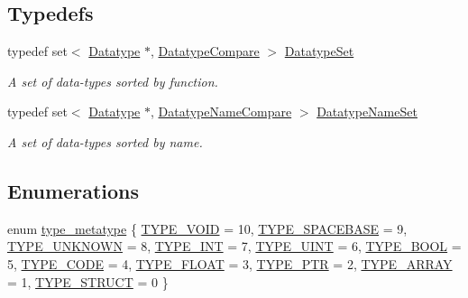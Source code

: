 \subsection*{Typedefs}
\begin{DoxyCompactItemize}
\item 
typedef set$<$ \mbox{\hyperlink{class_datatype}{Datatype}} $\ast$, \mbox{\hyperlink{struct_datatype_compare}{Datatype\+Compare}} $>$ \mbox{\hyperlink{type_8hh_a718b9f8902a3f2dcc61b4eb84c58adf2}{Datatype\+Set}}
\begin{DoxyCompactList}\small\item\em A set of data-\/types sorted by function. \end{DoxyCompactList}\item 
typedef set$<$ \mbox{\hyperlink{class_datatype}{Datatype}} $\ast$, \mbox{\hyperlink{struct_datatype_name_compare}{Datatype\+Name\+Compare}} $>$ \mbox{\hyperlink{type_8hh_aa1db0a143363e2b1d1150e3f2168c3ea}{Datatype\+Name\+Set}}
\begin{DoxyCompactList}\small\item\em A set of data-\/types sorted by name. \end{DoxyCompactList}\end{DoxyCompactItemize}
\subsection*{Enumerations}
\begin{DoxyCompactItemize}
\item 
enum \mbox{\hyperlink{type_8hh_aef6429f2523cdf4d415ba04a0209e61f}{type\+\_\+metatype}} \{ \newline
\mbox{\hyperlink{type_8hh_aef6429f2523cdf4d415ba04a0209e61fa84de340fe64164ed0dcf473aad846961}{T\+Y\+P\+E\+\_\+\+V\+O\+ID}} = 10, 
\mbox{\hyperlink{type_8hh_aef6429f2523cdf4d415ba04a0209e61fae8e2fb69af09eb8907e86b16ff585324}{T\+Y\+P\+E\+\_\+\+S\+P\+A\+C\+E\+B\+A\+SE}} = 9, 
\mbox{\hyperlink{type_8hh_aef6429f2523cdf4d415ba04a0209e61fa64599dea7071bc28732936e0bfddff3e}{T\+Y\+P\+E\+\_\+\+U\+N\+K\+N\+O\+WN}} = 8, 
\mbox{\hyperlink{type_8hh_aef6429f2523cdf4d415ba04a0209e61fa4fcd4421533bb21c827865bdbac4fef9}{T\+Y\+P\+E\+\_\+\+I\+NT}} = 7, 
\newline
\mbox{\hyperlink{type_8hh_aef6429f2523cdf4d415ba04a0209e61faba807ad7d41a3ac08fd4a71e9e013192}{T\+Y\+P\+E\+\_\+\+U\+I\+NT}} = 6, 
\mbox{\hyperlink{type_8hh_aef6429f2523cdf4d415ba04a0209e61fa3e0f738756c5205d71c69d955603f46c}{T\+Y\+P\+E\+\_\+\+B\+O\+OL}} = 5, 
\mbox{\hyperlink{type_8hh_aef6429f2523cdf4d415ba04a0209e61fa88922d1c65a64d2f39ebaba3411aa057}{T\+Y\+P\+E\+\_\+\+C\+O\+DE}} = 4, 
\mbox{\hyperlink{type_8hh_aef6429f2523cdf4d415ba04a0209e61fa19a0a402d33a2e049e91ea9e37e90c2f}{T\+Y\+P\+E\+\_\+\+F\+L\+O\+AT}} = 3, 
\newline
\mbox{\hyperlink{type_8hh_aef6429f2523cdf4d415ba04a0209e61fa311715f465e358409d513be004f82b2f}{T\+Y\+P\+E\+\_\+\+P\+TR}} = 2, 
\mbox{\hyperlink{type_8hh_aef6429f2523cdf4d415ba04a0209e61fad189c0a53681ec74eeea1f56d08d741f}{T\+Y\+P\+E\+\_\+\+A\+R\+R\+AY}} = 1, 
\mbox{\hyperlink{type_8hh_aef6429f2523cdf4d415ba04a0209e61fa9001cd1bc103bb1d664228d46715f65c}{T\+Y\+P\+E\+\_\+\+S\+T\+R\+U\+CT}} = 0
 \}
\end{DoxyCompactItemize}
